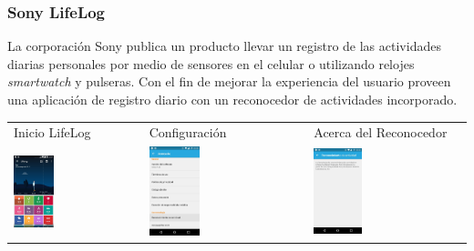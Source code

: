 \subsubsection{Sony LifeLog}
\label{intro:sony-lifelog}\label{intro:har-life-log}
La corporación Sony publica un producto llevar un registro de las actividades diarias personales por medio de sensores
en el celular o utilizando relojes \emph{smartwatch} y pulseras. Con el fin de mejorar la experiencia del usuario proveen una aplicación de registro diario con un reconocedor de actividades incorporado.
\begin{table}[!h]
\begin{tabular}{lll}
\textsf{\relax 
Inicio LifeLog
} & \textsf{\relax 
Configuración
} & \textsf{\relax 
Acerca del Reconocedor
}\\
\includegraphics[width=0.33\textwidth]{anexos/graphics/lf_start.jpg}
 & 
\includegraphics[width=0.33\textwidth]{anexos/graphics/lf_conf.jpg}
 & 
\includegraphics[width=0.33\textwidth]{anexos/graphics/lf_actrec.jpg}

\end{tabular}
\end{table}
